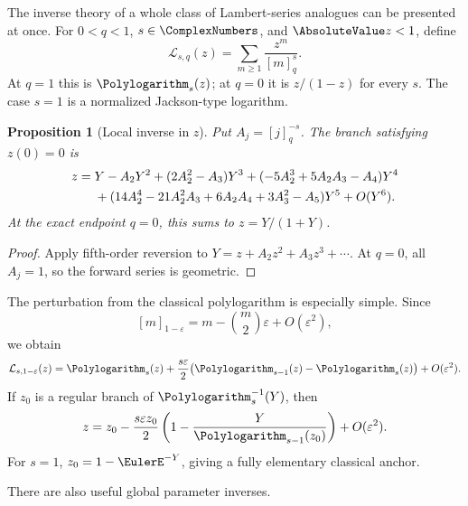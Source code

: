 \documentclass[11pt,a4paper,oneside,openany]{book}
\newtheorem{proposition}[theorem]{Proposition}
\theoremstyle{definition}
\theoremstyle{remark}
\newcommand{\eps}{\varepsilon}
\begin{document}
The inverse theory of a whole class of Lambert-series analogues can be
presented at once.  For \(0<q<1\), \(s\in\ComplexNumbers\), and \(\AbsoluteValue z<1\), define
\begin{equation}\label{eq:q-polylog-normalized}
 \mathcal L_{s,q}(z)=\sum_{m\ge1}\frac{z^m}{[m]_q^s}.
\end{equation}
At \(q=1\) this is \(\Polylogarithm_s(z)\); at \(q=0\) it is \(z/(1-z)\) for every
\(s\).  The case \(s=1\) is a normalized Jackson-type logarithm.

\begin{proposition}[Local inverse in \(z\)]\label{prop:qpolylog-z-inverse}
Put \(A_j=[j]_q^{-s}\).  The branch satisfying \(z(0)=0\) is
\begin{align}
 z={}&Y-A_2Y^2+(2A_2^2-A_3)Y^3
 +(-5A_2^3+5A_2A_3-A_4)Y^4 \notag\\
 &+(14A_2^4-21A_2^2A_3+6A_2A_4+3A_3^2-A_5)Y^5
 +O(Y^6).
 \label{eq:qpolylog-z-inverse}
\end{align}
At the exact endpoint \(q=0\), this sums to \(z=Y/(1+Y)\).
\end{proposition}

\begin{proof}
Apply fifth-order reversion to
\(Y=z+A_2z^2+A_3z^3+\cdots\).  At \(q=0\), all \(A_j=1\), so the forward
series is geometric.
\end{proof}

The perturbation from the classical polylogarithm is especially simple.
Since
\begin{equation}\label{eq:q-number-near-one-m}
 [m]_{1-\eps}=m-\binom m2\eps+O(\eps^2),
\end{equation}
we obtain
\begin{equation}\label{eq:qpolylog-near-one}
 \mathcal L_{s,1-\eps}(z)
 =\Polylogarithm_s(z)+\frac{s\eps}{2}\bigl(\Polylogarithm_{s-1}(z)-\Polylogarithm_s(z)\bigr)
 +O(\eps^2).
\end{equation}
If \(z_0\) is a regular branch of \(\Polylogarithm_s^{-1}(Y)\), then
\begin{equation}\label{eq:qpolylog-inverse-near-one}
 z=z_0-\frac{s\eps z_0}{2}
 \left(1-\frac{Y}{\Polylogarithm_{s-1}(z_0)}\right)+O(\eps^2).
\end{equation}
For \(s=1\), \(z_0=1-\EulerE^{-Y}\), giving a fully elementary classical
anchor.

There are also useful global parameter inverses.
\end{document}

